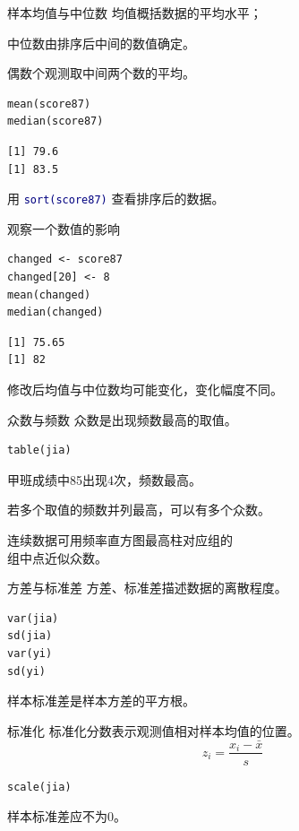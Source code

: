 \documentclass[14pt,compress,t,noamsthm,notheorem,table,handout,fontset=none]{ctexbeamer}
\newcommand{\code}[1]{\textcolor{navy}{\texttt{#1}}}
\newcommand{\outputlabel}{\par\smallskip{\fontsize{10.5}{13}\selectfont\bfseries\color{muted}Console 输出\par}}
\begin{document}
\begin{frame}[fragile]{样本均值与中位数}
  均值概括数据的平均水平；\par
  中位数由排序后中间的数值确定。\par
  偶数个观测取中间两个数的平均。
\begin{lstlisting}
mean(score87)
median(score87)
\end{lstlisting}
\outputlabel
\begin{lstlisting}[style=output]
[1] 79.6
[1] 83.5
\end{lstlisting}
  用 \code{sort(score87)} 查看排序后的数据。
\end{frame}
\begin{frame}[fragile]{观察一个数值的影响}
\begin{lstlisting}
changed <- score87
changed[20] <- 8
mean(changed)
median(changed)
\end{lstlisting}
\outputlabel
\begin{lstlisting}[style=output]
[1] 75.65
[1] 82
\end{lstlisting}
  修改后均值与中位数均可能变化，变化幅度不同。
\end{frame}
\begin{frame}[fragile]{众数与频数}
  众数是出现频数最高的取值。
\begin{lstlisting}
table(jia)
\end{lstlisting}
  甲班成绩中85出现4次，频数最高。
  \par\medskip
  若多个取值的频数并列最高，可以有多个众数。
  \par\medskip
  连续数据可用频率直方图最高柱对应组的\\
  组中点近似众数。
\end{frame}
\begin{frame}[fragile]{方差与标准差}
  方差、标准差描述数据的离散程度。
\begin{lstlisting}
var(jia)
sd(jia)
var(yi)
sd(yi)
\end{lstlisting}
  样本标准差是样本方差的平方根。
\end{frame}
\begin{frame}[fragile]{标准化}
  标准化分数表示观测值相对样本均值的位置。
\[
  z_i=\frac{x_i-\bar{x}}{s}
\]
\begin{lstlisting}
scale(jia)
\end{lstlisting}
  样本标准差应不为0。
\end{frame}
\end{document}

